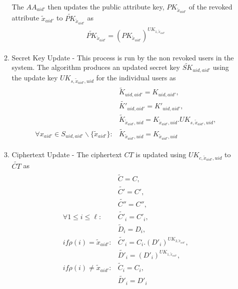 \begin{enumerate}
\begin{enumerate}
		The $AA_{aid'}$ then updates the public attribute key, $PK_{\tilde{x}_{aid'}}$ of the revoked attribute $\tilde{x}_{aid'}$ to $\tilde{PK}_{\tilde{x}_{aid'}}$ as
		\begin{align} \label{eq:1}
		\begin{split}
		\tilde{PK}_{\tilde{x}_{aid'}} = ({PK}_{\tilde{x}_{aid'}})^{UK_{1,\tilde{x}_{aid'}}}
		\end{split}
		\end{align}
		
		
		\item Secret Key Update - This process is run by the non revoked users in the system. The algorithm produces an updated secret key $\tilde{SK}_{uid,aid'}$ using the update key ${UK}_{s,\tilde{x}_{aid'},uid}$ for the individual users as
		\begin{align}
		\begin{split}
		&\tilde{K}_{uid,aid'} = {K}_{uid,aid'}, \\ &\tilde{K'}_{uid,aid'} = {K'}_{uid,aid'}, \\
		&\tilde{K}_{\tilde{x}_{aid'},uid} = {K}_{\tilde{x}_{aid'},uid}.{UK}_{s,\tilde{x}_{aid'},uid},\\
		\forall x_{aid'} \in S_{uid,aid'} \backslash \{ \tilde{x}_{aid'} \} \colon &\tilde{K}_{\tilde{x}_{aid'},uid} = {K}_{\tilde{x}_{aid'},uid}
		\end{split} 
		\end{align}
		
		\item Ciphertext Update - The ciphertext $CT$ is updated using ${UK}_{c,\tilde{x}_{aid'},uid}$ to $\tilde{CT}$ as
		\begin{align}
		\begin{split}
		&\tilde{C} = C, \\ &\tilde{C'} = C', \\ &\tilde{C''} = C'',\\
		\forall 1 \leq i \leq \ell : &\tilde{C'}_{i} = C'_{i}, \\ &\tilde{D}_{i} = D_{i},\\
		if \rho(i) = \tilde{x}_{aid'} : &\tilde{C'}_{i} = C_{i} . (D'_{i})^{UK_{2,\tilde{x}_{aid'}}}, \\ &\tilde{D'}_{i} = (D'_{i})^{UK_{1,\tilde{x}_{aid'}}},\\
		if \rho(i) \neq \tilde{x}_{aid'} : &\tilde{C}_{i} = C_{i}, \\ &\tilde{D'}_{i} = D'_{i}
		\end{split}
		\end{align}
	\end{enumerate}
	
\end{enumerate}



